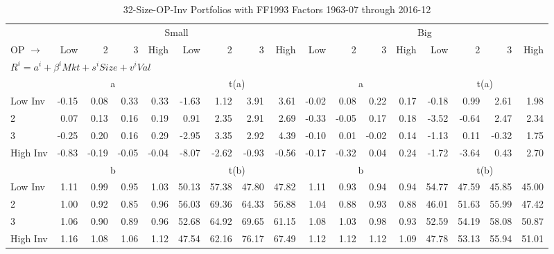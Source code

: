 
\begin{table}[!ht]
\centering
\caption{32-Size-OP-Inv Portfolios with FF1993 Factors 1963-07 through 2016-12}
\begin{tabular}{lrrrrrrrrrrrrrrrr}
  \toprule
    & \multicolumn{8}{c}{Small} & \multicolumn{8}{c}{Big} \\
      \cmidrule(r){2-9} \cmidrule(r){10-17}
    OP $\rightarrow$ & Low & 2 & 3 & High & Low & 2 & 3 & High & Low & 2 & 3 & High & Low & 2 & 3 & High \\ 
  \midrule
  \multicolumn{17}{l}{$R^i=a^i+\beta^iMkt+s^iSize+v^iVal$} \\

  
    
      & \multicolumn{4}{c}{a} & \multicolumn{4}{c}{t(a)}
    
      & \multicolumn{4}{c}{a} & \multicolumn{4}{c}{t(a)}
    
    \\
      \cmidrule(r){2-5} \cmidrule(r){6-9} \cmidrule(r){10-13} \cmidrule(r){14-17}

    Low Inv   & -0.15  & 0.08  & 0.33  & 0.33  & -1.63  & 1.12  & 3.91  & 3.61  & -0.02  & 0.08  & 0.22  & 0.17  & -0.18  & 0.99  & 2.61  & 1.98  \\
           2  & 0.07  & 0.13  & 0.16  & 0.19  & 0.91  & 2.35  & 2.91  & 2.69  & -0.33  & -0.05  & 0.17  & 0.18  & -3.52  & -0.64  & 2.47  & 2.34  \\
           3  & -0.25  & 0.20  & 0.16  & 0.29  & -2.95  & 3.35  & 2.92  & 4.39  & -0.10  & 0.01  & -0.02  & 0.14  & -1.13  & 0.11  & -0.32  & 1.75  \\
    High Inv  & -0.83  & -0.19  & -0.05  & -0.04  & -8.07  & -2.62  & -0.93  & -0.56  & -0.17  & -0.32  & 0.04  & 0.24  & -1.72  & -3.64  & 0.43  & 2.70  \\

  
    
      & \multicolumn{4}{c}{b} & \multicolumn{4}{c}{t(b)}
    
      & \multicolumn{4}{c}{b} & \multicolumn{4}{c}{t(b)}
    
    \\
      \cmidrule(r){2-5} \cmidrule(r){6-9} \cmidrule(r){10-13} \cmidrule(r){14-17}

    Low Inv   & 1.11  & 0.99  & 0.95  & 1.03  & 50.13  & 57.38  & 47.80  & 47.82  & 1.11  & 0.93  & 0.94  & 0.94  & 54.77  & 47.59  & 45.85  & 45.00  \\
           2  & 1.00  & 0.92  & 0.85  & 0.96  & 56.03  & 69.36  & 64.33  & 56.88  & 1.04  & 0.88  & 0.93  & 0.88  & 46.01  & 51.63  & 55.99  & 47.42  \\
           3  & 1.06  & 0.90  & 0.89  & 0.96  & 52.68  & 64.92  & 69.65  & 61.15  & 1.08  & 1.03  & 0.98  & 0.93  & 52.59  & 54.19  & 58.08  & 50.87  \\
    High Inv  & 1.16  & 1.08  & 1.06  & 1.12  & 47.54  & 62.16  & 76.17  & 67.49  & 1.12  & 1.12  & 1.12  & 1.09  & 47.78  & 53.13  & 55.94  & 51.01  \\


\end{tabular}
\end{table}
